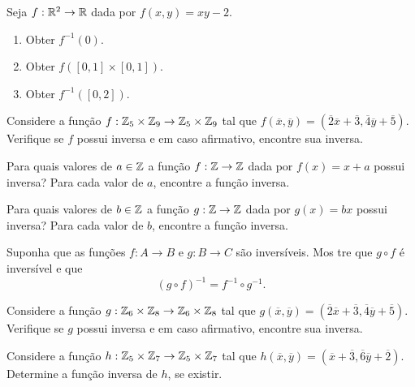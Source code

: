 \documentclass[12pt]{exam}
\begin{document}
    \vspace{.3cm}

    \questao{} Seja $f: \mathbb{R}^2 \to \mathbb{R}$ dada por $f(x,y) = xy - 2$.
    \begin{enumerate}[label={\alph*})]
        \item Obter $f^{-1}({0})$.

        \item Obter $f([0,1]\times [0,1])$.

        \item Obter $f^{-1}([0,2])$.
    \end{enumerate}

    \vspace{.3cm}


    \questao{} Considere a fun{\c c}{\~a}o $f : \mathbb{Z}_5 \times \mathbb{Z}_9 \to \mathbb{Z}_5 \times \mathbb{Z}_9$ tal que $f(\overline{x},\overline{y}) = (\overline{2} \overline{x} + \overline{3}, \overline{4}\overline{y} + \overline{5})$. Verifique se $f$ possui inversa e em caso afirmativo, encontre sua inversa.

    \vspace{.3cm}

    \questao{} Para quais valores de $a \in \mathbb{Z}$ a função $f : \mathbb{Z} \to \mathbb{Z}$ dada por $f(x)       = x + a$ possui inversa? Para cada valor de $a$, encontre a função inversa.

    \vspace{.3cm}

    \questao{} Para quais valores de $b \in \mathbb{Z}$ a função $g : \mathbb{Z} \to \mathbb{Z}$ dada por $g(x)       = bx$ possui inversa? Para cada valor de $b$, encontre a função inversa.

    \vspace{.3cm}

    \questao{} Suponha que as funções $f : A \to B$ e $g : B \to C$ são inversíveis. Mos      tre que $g \circ f$ é inversível e que
    \[
        (g \circ f)^{-1} = f^{-1} \circ g^{-1}.
    \]

    \vspace{.3cm}

    \questao{} Considere a fun{\c c}{\~a}o $g : \mathbb{Z}_6 \times \mathbb{Z}_8 \to \mathbb{Z}_6 \times \mathbb{Z}_8$ tal que $g(\overline{x},\overline{y}) = (\overline{2} \overline{x} + \overline{3}, \overline{4}\overline{y} + \overline{5})$. Verifique se $g$ possui inversa e em caso afirmativo, encontre sua inversa.

    \vspace{.3cm}

    \questao{} Considere a fun{\c c}{\~a}o $h : \mathbb{Z}_5 \times \mathbb{Z}_7 \to \mathbb{Z}_5 \times \mathbb{Z}_7$ tal que $h(\overline{x},\overline{y}) = (\overline{x} + \overline{3}, \overline{6}\overline{y} + \overline{2})$. Determine a fun\c{c}\~ao inversa de $h$, se existir.
\end{document}

